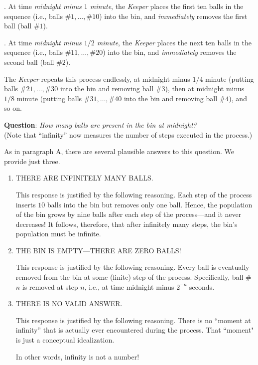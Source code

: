 \smallskip

.
At time {\em midnight minus $1$ minute}, the {\it Keeper} places the first ten balls in the sequence (i.e., balls $\#1, \ldots, \#10$) into the bin, and {\em immediately} removes the first ball (ball \#$1$).

\smallskip

.
At time {\em midnight minus $1/2$ minute}, the {\it Keeper} places the next ten balls in the sequence
(i.e., balls $\#11, \ldots, \#20$) into the bin, and {\em immediately} removes the second ball (ball \#$2$).

\smallskip

\noindent
The {\it Keeper} repeats this process endlessly, at midnight minus $1/4$ minute (putting balls $\#21, \ldots, \#30$ into the bin and removing ball \#$3$), then at midnight minus $1/8$ minute (putting balls $\#31, \ldots, \#40$ into the bin and removing ball \#$4$), and so on.

\smallskip

\noindent
{\bf Question}: {\it How many balls are present in the bin at midnight?}  \\
(Note that ``infinity'' now measures the number of steps executed in the process.)

\medskip

\noindent
As in paragraph {\small\sf A}, there are several plausible answers to this question.  We provide just three.
\begin{enumerate}
\item
THERE ARE INFINITELY MANY BALLS.

\smallskip

This response is justified by the following reasoning.  Each step of the process inserts $10$ balls into the bin but removes only one ball.  Hence, the population of the bin grows by nine balls after each step of the process---and it never decreases!  It follows, therefore, that after infinitely many steps, the bin's population must be infinite.

\medskip\item
THE BIN IS EMPTY---THERE ARE ZERO BALLS!

\smallskip

This response is justified by the following reasoning.  Every ball is eventually removed from the bin at some (finite) step of the process. Specifically, ball \#$n$ is removed at step $n$, i.e., at time midnight minus $2^{-n}$ seconds.

\medskip\item
THERE IS NO VALID ANSWER.

\smallskip

This response is justified by the following reasoning.  There is no ``moment at infinity'' that is actually ever encountered during the process.  That ``moment" is just a conceptual idealization.

\smallskip

In other words, infinity is not a number!
\end{enumerate}


